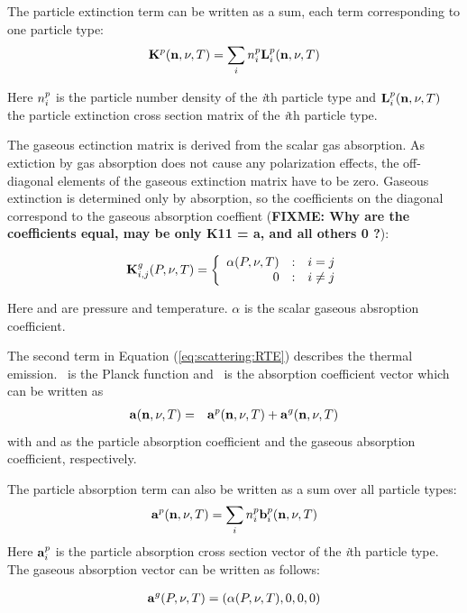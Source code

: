 The particle extinction term can be written as a sum, each term
corresponding to one particle type:
\begin{eqnarray}
  {\bf K}^{p}({\bf n}, \nu, T) = \sum_i n^p_i {\bf L}^{p}_i ({\bf n}, \nu, T)
\end{eqnarray}

Here $n^p_i$ is the particle number density of the {\sl i}th
particle type and ${\bf L}^{p}_i({\bf n}, \nu, T)$ the particle extinction cross
section matrix of the {\sl i}th particle type.


The gaseous ectinction matrix is derived from the scalar gas absorption. As extiction by gas absorption does not cause any polarization effects, the off-diagonal elements of the gaseous extinction matrix have to be zero. Gaseous extinction is determined only by absorption, so the coefficients on the diagonal correspond to the gaseous absorption coeffient ({\bf FIXME: Why are the coefficients equal, may be only K11 = a, and all others 0 ?}):

\[
  \aExtMat{g}_{i,j}(\Prs, \Frq, \Tmp) = \left\{\begin{array}{r@{\quad:\quad}l}
       \alpha(\Prs, \Frq, \Tmp)  & i = j \\ 0 & i \not= j \end{array} \right. 
\]

Here \Prs and \Tmp are pressure and temperature. $\alpha$ is the scalar gaseous absroption coefficient.

The second term in Equation (\ref{eq:scattering:RTE}) describes the
thermal emission. \Planck\ is the Planck function and \AbsVec\ is the
absorption coefficient vector which can be written as
\begin{eqnarray}
  {\bf a} ({\bf n}, \nu, T)  &=& {\bf a}^{p} ({\bf n}, \nu, T) + {\bf a}^{g} ({\bf n}, \nu, T) 
\end{eqnarray}
with  and  as the particle absorption
coefficient and the gaseous absorption coefficient, respectively.

The particle absorption term can also be written as a sum over all
particle types:
\begin{eqnarray}
  {\bf a}^{p}({\bf n}, \nu, T) = \sum_i n^p_i {\bf b}^{p}_i ({\bf n}, \nu, T)
\end{eqnarray}
Here ${\bf a}^{p}_i$ is the particle absorption cross section vector
of the {\sl i}th particle type.
The gaseous absorption vector can be written as follows:

\begin{eqnarray}
  {\bf a}^{g}(P, \nu, T)  = (\alpha(P, \nu, T), 0, 0, 0) 
\end{eqnarray}


